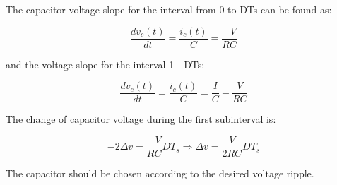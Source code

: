 The capacitor voltage slope for the interval from 0 to DTs can be found as:

\begin{equation}
	\frac{dv_{c}(t)}{dt} = \frac{i_{c}(t)}{C} = \frac{-V}{RC}
	\label{eq:CBC_CVR1}
\end{equation}

and the voltage slope for the interval 1 - DTs:

\begin{equation}
	\frac{dv_c(t)}{dt} = \frac{i_c(t)}{C} = \frac{I}{C} - \frac{V}{RC}
	\label{eq:CBC_CVR2}
\end{equation}

The change of capacitor voltage during the first subinterval is:

\begin{equation}
	-2\Delta v = \frac{-V}{RC}DT_s \Rightarrow
  \Delta v = \frac{V}{2RC}DT_s
	\label{eq:CBC_CVR3}
\end{equation}

The capacitor should be chosen according to the desired voltage ripple.
